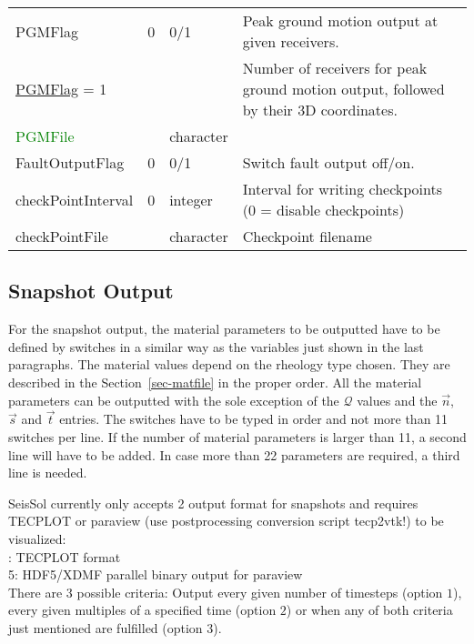 \documentclass[12pt,twoside]{article}
\def\Q{{\mathcal Q}}
\begin{document}
\begin{table}[H]
\begin{center}
\begin{tabular}{|p{4cm}|p{2.7cm}|p{2cm}|p{4cm}|}
PGMFlag & 0 & 0/1 & Peak ground motion output at given receivers.\\
\hdashline
\uline{PGMFlag} = 1 & & & Number of receivers for peak ground motion output, followed by their 3D coordinates.\\
\textcolor{green}{PGMFile} & & character & \\
\hline
FaultOutputFlag & 0 & 0/1 & Switch fault output off/on.\\
\hline
checkPointInterval & 0 & integer & Interval for writing checkpoints (0 = disable checkpoints) \\
checkPointFile & & character & Checkpoint filename \\
\hline
\end{tabular}
\end{center}
\label{output-table}
\end{table}



\subsection{Snapshot Output}
\label{sec-block-snap}

For the snapshot output, the material parameters to be outputted have to be defined by switches 
in a similar way as the variables just shown in the last paragraphs. 
The material values depend on the rheology type chosen.
They are described in the Section~\ref{sec-matfile} in the proper order.
All the material parameters can be outputted with the sole exception of the $\Q$ values 
and the $\vec n$, $\vec s$ and $\vec t$ entries.
The switches have to be typed in order and not more than 11 switches per line.
If the number of material parameters is larger than 11, a second line will have to be added.
In case more than 22 parameters are required, a third line is needed.

\noindent
SeisSol currently only accepts 2 output format for snapshots 
and requires TECPLOT or paraview (use postprocessing conversion script tecp2vtk!) to be visualized:\\

: TECPLOT format\\
5: HDF5/XDMF parallel binary output for paraview\\

\noindent
There are 3 possible criteria: Output every given number of timesteps 
(option $1$), every given multiples of a specified time (option $2$) 
or when any of both criteria just mentioned are fulfilled (option $3$). \\
\end{document}
